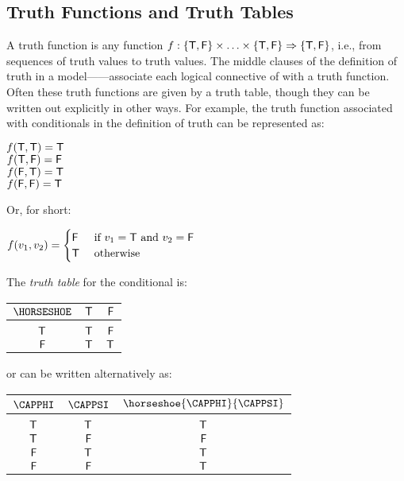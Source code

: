 \subsection{Truth Functions and Truth Tables}\label{Truth Functions Truth Tables and Boolean Operators}
A truth function is any function $f:\{\mathsf{T},\mathsf{F}\}\times\ldots\times\{\mathsf{T},\mathsf{F}\}\Rightarrow\{\mathsf{T},\mathsf{F}\}$, i.e., from sequences of truth values to truth values.  The middle clauses of the definition of truth in a model------associate each logical connective of \GSL{} with a truth function. 
Often these truth functions are given by a truth table, though they can be written out explicitly in other ways.  
For example, the truth function associated with conditionals in the definition of truth can be represented as:
\begin{center} 
	$f(\mathsf{T},\mathsf{T})=\mathsf{T}$ \\
	$f(\mathsf{T},\mathsf{F})=\mathsf{F}$ \\
	$f(\mathsf{F},\mathsf{T})=\mathsf{T}$ \\
	$f(\mathsf{F},\mathsf{F})=\mathsf{T}$ \\
\end{center}
Or, for short:
\begin{menumerate} 
	\item\hspace{1in}$f(v_1,v_2)=
	\begin{cases}
	\mathsf{F}{} & \text{ if } v_1=\mathsf{T}\text{ and }v_2=\mathsf{F} \\
	\mathsf{T}{} & \text{ otherwise}
	\end{cases}$
\end{menumerate}
The \emph{truth table} for the conditional is:
\begin{menumerate}
	\item\hspace{2in}\begin{tabular}[t]{c | c c}
		$\HORSESHOE$ & $\mathsf{T}$ & $\mathsf{F}$ \\
		\hline
		& & \\[-.25cm]
		$\mathsf{T}$ & $\mathsf{T}$ & $\mathsf{F}$ \\
		$\mathsf{F}$ & $\mathsf{T}$ & $\mathsf{T}$  
	\end{tabular}
\end{menumerate}
or can be written alternatively as:
\begin{menumerate}
	\item\hspace{1.9in}\begin{tabular}[t]{c c c}
		$\CAPPHI$ & $\CAPPSI$ & $\horseshoe{\CAPPHI}{\CAPPSI}$ \\
		\hline 
		& & \\[-.25cm]
		$\mathsf{T}$ & $\mathsf{T}$ & $\mathsf{T}$ \\
		$\mathsf{T}$ & $\mathsf{F}$ & $\mathsf{F}$ \\
		$\mathsf{F}$ & $\mathsf{T}$ & $\mathsf{T}$ \\
		$\mathsf{F}$ & $\mathsf{F}$ & $\mathsf{T}$ \\
	\end{tabular}
\end{menumerate}

